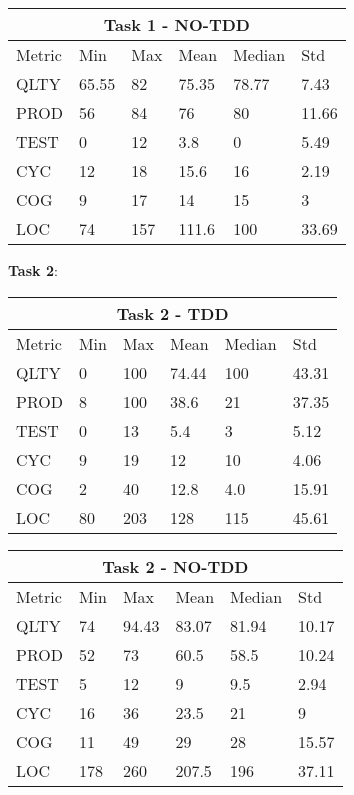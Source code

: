 \noindent
\begin{tabular}{ |p{2cm}||p{1.6cm}|p{1.6cm}|p{1.6cm}|p{1.6cm}|p{1.6cm}|}
    \hline
        \multicolumn{6}{|c|}{Task 1 - NO-TDD} \\
    \hline
        Metric & Min & Max & Mean & Median & Std\\
    \hline
        QLTY & 65.55 & 82 & 75.35 & 78.77 & 7.43 \\
        PROD & 56 & 84 & 76 & 80 & 11.66 \\
        TEST & 0 & 12 & 3.8 & 0 & 5.49 \\
        CYC & 12 & 18 & 15.6 & 16 & 2.19 \\
        COG & 9 & 17 & 14 & 15 & 3 \\
        LOC & 74 & 157 & 111.6 & 100 & 33.69 \\
    \hline
\end{tabular}


\textbf{Task 2}:

\noindent
\begin{tabular}{ |p{2cm}||p{1.6cm}|p{1.6cm}|p{1.6cm}|p{1.6cm}|p{1.6cm}|}
    \hline
        \multicolumn{6}{|c|}{Task 2 - TDD} \\
    \hline
        Metric & Min & Max & Mean & Median & Std\\
    \hline
        QLTY & 0 & 100 & 74.44 & 100 & 43.31 \\
        PROD & 8 & 100 & 38.6 & 21 & 37.35 \\
        TEST & 0 & 13 & 5.4 & 3 & 5.12 \\
        CYC & 9 & 19 & 12 & 10 & 4.06 \\
        COG & 2 & 40 & 12.8 & 4.0 & 15.91 \\
        LOC & 80 & 203 & 128 & 115 & 45.61 \\
    \hline
\end{tabular}

\noindent
\begin{tabular}{ |p{2cm}||p{1.6cm}|p{1.6cm}|p{1.6cm}|p{1.6cm}|p{1.6cm}|}
    \hline
        \multicolumn{6}{|c|}{Task 2 - NO-TDD} \\
    \hline
        Metric & Min & Max & Mean & Median & Std\\
    \hline
        QLTY & 74 & 94.43 & 83.07 & 81.94 & 10.17 \\
        PROD & 52 & 73 & 60.5 & 58.5 & 10.24 \\
        TEST & 5 & 12 & 9 & 9.5 & 2.94 \\
        CYC & 16 & 36 & 23.5 & 21 & 9 \\
        COG & 11 & 49 & 29 & 28 & 15.57 \\
        LOC & 178 & 260 & 207.5 & 196 & 37.11 \\
    \hline
\end{tabular}

